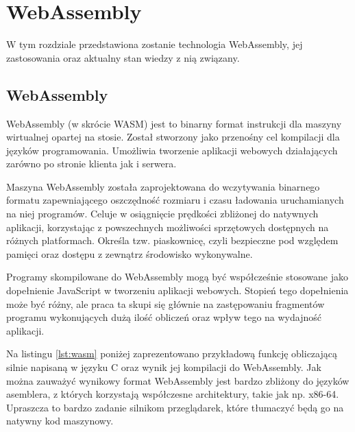 \documentclass[language=polish,type=master]{aghmodern}
\begin{document}
\chapter{WebAssembly}
W tym rozdziale przedstawiona zostanie technologia WebAssembly, jej zastosowania oraz aktualny stan wiedzy z nią związany.

\section{WebAssembly}
WebAssembly (w skrócie WASM) jest to binarny format instrukcji dla maszyny wirtualnej opartej na stosie.
Został stworzony jako przenośny cel kompilacji dla języków programowania\footnotemark{}.
Umożliwia tworzenie aplikacji webowych działających zarówno po stronie klienta jak i serwera.

Maszyna WebAssembly została zaprojektowana do wczytywania binarnego formatu zapewniającego oszczędność rozmiaru i czasu ładowania uruchamianych na niej programów.
Celuje w osiągnięcie prędkości zbliżonej do natywnych aplikacji, korzystając z powszechnych możliwości sprzętowych\footnotemark{} dostępnych na różnych platformach.
Określa tzw. piaskownicę\footnotemark{}, czyli bezpieczne pod względem pamięci oraz dostępu z zewnątrz środowisko wykonywalne.

Programy skompilowane do WebAssembly mogą być współcześnie stosowane jako dopełnienie JavaScript w tworzeniu aplikacji webowych.
Stopień tego dopełnienia może być różny, ale praca ta skupi się głównie na zastępowaniu fragmentów programu wykonujących dużą ilość obliczeń oraz wpływ tego na wydajność aplikacji.

Na listingu \ref{lst:wasm} poniżej zaprezentowano przykładową funkcję obliczającą silnie napisaną w języku C oraz wynik jej kompilacji do WebAssembly.
Jak można zauważyć wynikowy format WebAssembly jest bardzo zbliżony do języków asemblera, z których korzystają współczesne architektury, takie jak np. x86-64.
Upraszcza to bardzo zadanie silnikom przeglądarek, które tłumaczyć będą go na natywny kod maszynowy.
\end{document}
